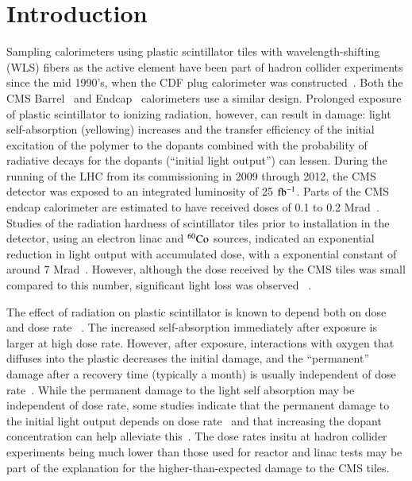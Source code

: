 \documentclass[review]{elsarticle}
\begin{document}
\section{Introduction}
Sampling calorimeters using plastic scintillator tiles
with wavelength-shifting (WLS) fibers as the active element
have been part of hadron
collider experiments since the mid 1990's, when the CDF plug
calorimeter was constructed~\cite{Aota1995557}.  Both the CMS
Barrel~\cite{CMSHB} and Endcap~\cite{HCALTDR1997} calorimeters use a similar design.
Prolonged exposure of plastic scintillator to
ionizing radiation, however, can result in damage:
light self-absorption (yellowing) increases and
the transfer efficiency of the initial excitation of the polymer to the
dopants combined with the probability of radiative decays for the dopants (``initial light output'') can lessen.  
During the running of the LHC from its commissioning in 2009
through 2012, the CMS
detector was exposed to an integrated luminosity of 25 ${\rm fb^{-1}}$.  Parts of the
CMS endcap calorimeter are estimated to have received doses of 0.1 to 0.2 Mrad~\cite{ecfa2015}.
Studies of the radiation hardness of scintillator tiles
prior to installation in the detector,
using an electron linac and ${\rm ^{60}Co}$ sources,
indicated an exponential reduction in 
light output with accumulated dose, with a exponential constant of 
around 7 Mrad~\cite{vasken,ByonWagner1993263}.  
However, although the dose received by the CMS tiles was
small compared to this number,
significant light loss was observed ~\cite{phaseiitdr}.


The effect of radiation on plastic scintillator is known to depend
both on dose and dose rate ~\cite{sauli,34504,Wick1991472,289295,173180,173178,Giokaris1993315}.  The increased self-absorption immediately after exposure is larger at high dose rate. However, after exposure, interactions 
with oxygen that diffuses into
the plastic decreases the initial damage, and the ``permanent'' damage after
a recovery time (typically a month) is usually independent of dose rate~\cite{sauli}.  
While the permanent damage to the light self absorption may be
independent of dose rate, some studies indicate that the 
permanent damage to the initial light output depends
on dose rate~\cite{Biagtan1996125} and that increasing the dopant concentration
can help alleviate this~\cite{zorn3,sauli}.  The dose rates 
insitu at hadron collider experiments being much lower than those
used for reactor and linac tests may be part of the explanation
for the higher-than-expected damage to the CMS tiles.
\end{document}
